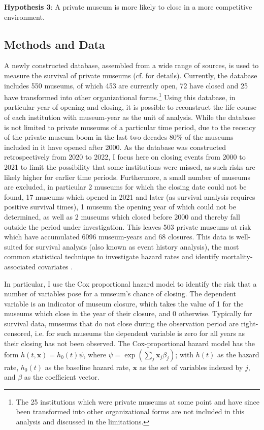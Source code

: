\documentclass[12pt]{article}
\begin{document}
\textbf{Hypothesis 3}: A private museum is more likely to close in a more competitive environment.
\subsection*{Methods and Data}




A newly constructed database, assembled from a wide range of sources, is used to measure the survival of private museums (cf. \textcite{Velthuis_etal_2023_boom} for details).
Currently, the database includes 550 museums, of which 453 are currently open, 72 have closed and 25 have transformed into other organizational forms.\footnote{The 25 institutions which were private museums at some point and have since been transformed into other organizational forms are not included in this analysis and discussed in the limitations.}
Using this database, in particular year of opening and closing, it is possible to reconstruct the life course of each institution with museum-year as the unit of analysis.
While the database is not limited to private museums of a particular time period, due to the recency of the private museum boom in the last two decades 80\% of the museums included in it have opened after 2000.
As the database was constructed retrospectively from 2020 to 2022, I focus here on closing events from 2000 to 2021 to limit the possibility that some institutions were missed, as such risks are likely higher for earlier time periods.
Furthermore, a small number of museums are excluded, in particular 2 museums for which the closing date could not be found, 17 museums which opened in 2021 and later (as survival analysis requires positive survival times), 1 museum the opening year of which could not be determined, as well as 2 museums which closed before 2000 and thereby fall outside the period under investigation.
This leaves 503 private museums at risk which have accumulated 6096 museum-years and 68 closures.
This data is well-suited for survival analysis (also known as event history analysis), the most common statistical technique to investigate hazard rates and identify mortality-associated covariates \parencite{Moore_2015_survival,Allison_2014_event}.



In particular, I use the Cox proportional hazard model to identify the risk that a number of variables pose for a museum's chance of closing. 
The dependent variable is an indicator of museum closure, which takes the value of 1 for the museums which close in the year of their closure, and 0 otherwise.
Typically for survival data, museums that do not close during the observation period are right-censored, i.e. for such museums the dependent variable is zero for all years as their closing has not been observed.
The Cox-proportional hazard model has the form \(h(t,\mathbf{x}) = h_0(t) \psi\), where \(\psi = \exp(\sum_{j} \mathbf{x}_j \beta_j)\); with \(h(t)\) as the hazard rate, \(h_0(t)\) as the baseline hazard rate, \(\mathbf{x}\) as the set of variables indexed by \(j\), and \(\beta\) as the coefficient vector.
\end{document}
